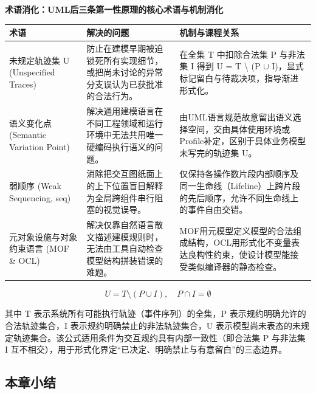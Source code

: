 \documentclass[UTF8,a4paper,11pt,fontset=fandol]{ctexart}
\begin{document}
\par{}\textbf{术语消化：UML后三条第一性原理的核心术语与机制消化}

\begin{center}\small\begin{tabularx}{\linewidth}{YYY}

\toprule

术语 & 解决的问题 & 机制与课程关系\\\midrule

未规定轨迹集 U (Unspecified Traces) & 防止在建模早期被迫锁死所有实现细节，或把尚未讨论的异常分支误认为已获批准的合法行为。 & 在全集 T 中扣除合法集 P 与非法集 I 得到 U = T \textbackslash{} (P \ensuremath{\cup} I)，显式标记留白与待裁决项，指导渐进形式化。\\[3pt]

语义变化点 (Semantic Variation Point) & 解决通用建模语言在不同工程领域和运行环境中无法共用唯一硬编码执行语义的问题。 & 由UML语言规范故意留出语义选择空间，交由具体使用环境或Profile补定，区别于具体业务模型未写完的轨迹集 U。\\[3pt]

弱顺序 (Weak Sequencing, seq) & 消除把交互图纸面上的上下位置盲目解释为全局跨组件串行阻塞的视觉误导。 & 仅保持各操作数片段内部顺序及同一生命线（Lifeline）上跨片段的先后顺序，允许不同生命线上的事件自由交错。\\[3pt]

元对象设施与对象约束语言 (MOF \& OCL) & 解决仅靠自然语言散文描述建模规则时，无法由工具自动检查模型结构拼装错误的难题。 & MOF用元模型定义模型的合法组成结构，OCL用形式化不变量表达良构性约束，使设计模型能接受类似编译器的静态检查。\\[3pt]

\bottomrule\end{tabularx}\end{center}

\[
U = T \setminus (P \cup I), \quad P \cap I = \emptyset
\]

其中 T 表示系统所有可能执行轨迹（事件序列）的全集，P 表示规约明确允许的合法轨迹集合，I 表示规约明确禁止的非法轨迹集合，U 表示模型尚未表态的未规定轨迹集合。该公式适用条件为交互规约具有内部一致性（即合法集 P 与非法集 I 互不相交），用于形式化界定“已决定、明确禁止与有意留白”的三态边界。

\subsection{本章小结}
\end{document}
